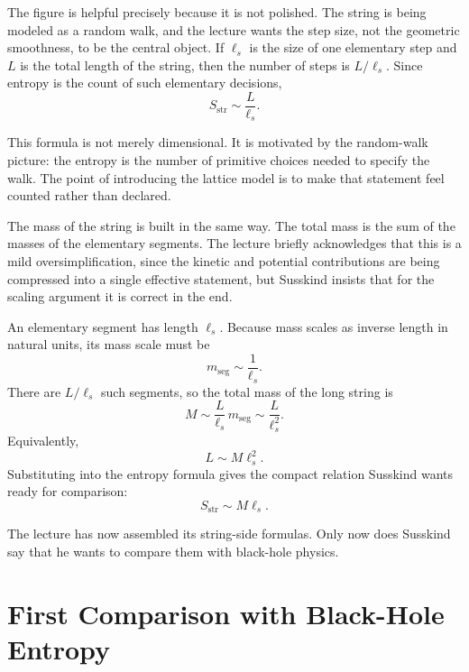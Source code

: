 The figure is helpful precisely because it is not polished. The string is being modeled as a random walk, and the lecture wants the step size, not the geometric smoothness, to be the central object. If \(\ell_s\) is the size of one elementary step and \(L\) is the total length of the string, then the number of steps is \(L/\ell_s\). Since entropy is the count of such elementary decisions,
\begin{equation}
S_{\mathrm{str}} \sim \frac{L}{\ell_s}.
\end{equation}

This formula is not merely dimensional. It is motivated by the random-walk picture: the entropy is the number of primitive choices needed to specify the walk. The point of introducing the lattice model is to make that statement feel counted rather than declared.

The mass of the string is built in the same way. The total mass is the sum of the masses of the elementary segments. The lecture briefly acknowledges that this is a mild oversimplification, since the kinetic and potential contributions are being compressed into a single effective statement, but Susskind insists that for the scaling argument it is correct in the end.

An elementary segment has length \(\ell_s\). Because mass scales as inverse length in natural units, its mass scale must be
\begin{equation}
m_{\mathrm{seg}} \sim \frac{1}{\ell_s}.
\end{equation}
There are \(L/\ell_s\) such segments, so the total mass of the long string is
\begin{equation}
M \sim \frac{L}{\ell_s}\, m_{\mathrm{seg}} \sim \frac{L}{\ell_s^2}.
\end{equation}
Equivalently,
\begin{equation}
L \sim M \ell_s^2.
\end{equation}
Substituting into the entropy formula gives the compact relation Susskind wants ready for comparison:
\begin{equation}
S_{\mathrm{str}} \sim M\ell_s.
\end{equation}

The lecture has now assembled its string-side formulas. Only now does Susskind say that he wants to compare them with black-hole physics.

\section{First Comparison with Black-Hole Entropy}


